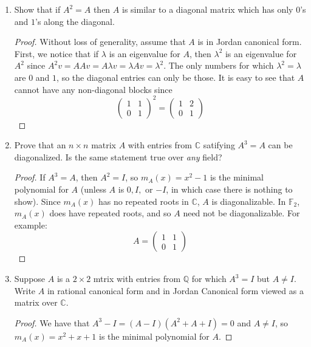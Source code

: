 \documentclass{report}
\newcommand{\Q}{\mathbb{Q}}
\newcommand{\C}{\mathbb{C}}
\newcommand{\F}{\mathbb{F}}
\begin{document}
\begin{enumerate}
		\begin{proof}
			The matrix on the left is in rational canonical form and has characteristic polynomial $x^p-1=(x-1)^p$, and so its only eigenvalue is $1$ with multiplicity $p$.
			The matrix on the right is in Jordan canonical form, and so it is easy to see that its only elementary divisor is $(x-1)^p$.
		\end{proof}
	\item Show that if $A^2=A$ then $A$ is similar to a diagonal matrix which has only $0$'s and $1$'s along the diagonal.
		\begin{proof}
			Without loss of generality, assume that $A$ is in Jordan canonical form. First, we notice that if $\lambda$ is an eigenvalue for $A$, then $\lambda^2$ is an eigenvalue for $A^2$
			since $A^2v=AAv=A\lambda v=\lambda Av=\lambda^2$. The only numbers for which $\lambda^2=\lambda$ are $0$ and $1$, so the diagonal entries can only be those.
			It is easy to see that $A$ cannot have any non-diagonal blocks since 
			$$\begin{pmatrix}1&1\\0&1\end{pmatrix}^2=\begin{pmatrix}1&2\\0&1\end{pmatrix}$$
		\end{proof}
	\item Prove that an $n\times n$ matrix $A$ with entries from $\C$ satifying $A^3=A$ can be diagonalized. Is the same statement true over \textit{any} field?
		\begin{proof}
			If $A^3=A$, then $A^2=I$, so $m_A(x)=x^2-1$ is the minimal polynomial for $A$ (unless $A$ is $0, I,$ or $-I$, in which case there is nothing to show).
			Since $m_A(x)$ has no repeated roots in $\C$, $A$ is diagonalizable. In $\F_2$, $m_A(x)$ does have repeated roots, and so $A$ need not be diagonalizable. For example:
			$$A=\begin{pmatrix}1&1\\0&1\end{pmatrix}$$
		\end{proof}
	\item Suppose $A$ is a $2\times 2$ mtrix with entries from $\Q$ for which $A^3=I$ but $A\neq I$. 
		Write $A$ in rational canonical form and in Jordan Canonical form viewed as a matrix over $\C$.
		\begin{proof}
			We have that $A^3-I=(A-I)(A^2+A+I)=0$ and $A\neq I$, so $m_A(x)=x^2+x+1$ is the minimal polynomial for $A$.

\end{proof}
\end{enumerate}
\end{document}
